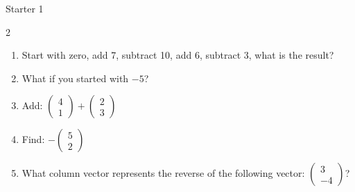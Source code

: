 \documentclass{beamer}
\newcommand{\ashow}[1]{\uncover<2->{\textcolor{red}{\small #1}}}
\begin{document}
\begin{frame}{Starter 1}
\hypertarget{q-st1}{}

\begin{multicols}{2}
\begin{enumerate}
  \item Start with zero, add 7, subtract 10, add 6, subtract 3, what is the result? \ashow{0}
  \item What if you started with $-5$? \ashow{$-5$}
  \item Add:
  $\begin{pmatrix}4\\1\end{pmatrix}
  +
  \begin{pmatrix}2\\3\end{pmatrix}$ \ashow{\(\binom{6}{4}\)}
  \item Find:
  $-\begin{pmatrix}5\\2\end{pmatrix}$ \ashow{\(\binom{-5}{-2}\)}
  \item What column vector represents the reverse of the following vector:
  $\begin{pmatrix}3\\-4\end{pmatrix}$? \ashow{\(\binom{-3}{4}\)}
\end{enumerate}
\end{multicols}

\vspace{0.3cm}



\begin{columns}[T]

\begin{center}
\end{center}


\end{columns}
\end{frame}
\end{document}
